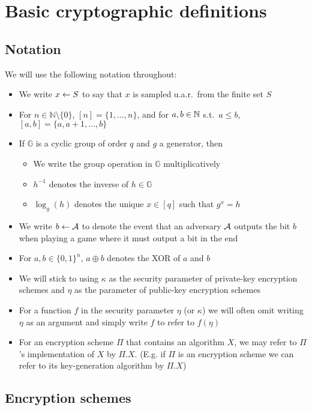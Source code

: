 \section{Basic cryptographic definitions} \label{sec:preliminaries-appendix}

\subsection{Notation}

We will use the following notation throughout:
\begin{itemize}
	\item We write $x \leftarrow S$ to say that $x$ is sampled u.a.r.\ from the finite set $S$
	\item For $n \in \mathbb{N} \setminus \{0\}$, $[n] = \{1, \ldots, n\}$, and for $a, b \in \mathbb{N}$ s.t.\ $a \le b$, $[a, b] = \{a, a + 1, \ldots, b\}$
	\item If $\mathbb{G}$ is a cyclic group of order $q$ and $g$ a generator, then
	      \begin{itemize}
		      \item We write the group operation in $\mathbb{G}$ multiplicatively
		      \item $h^{-1}$ denotes the inverse of $h \in \mathbb{G}$
		      \item $\log_g(h)$ denotes the unique $x \in [q]$ such that $g^x = h$
	      \end{itemize}
	\item We write $b \leftarrow \mathcal{A}$ to denote the event that an adversary $\mathcal{A}$ outputs the bit $b$ when playing a game where it must output a bit in the end
	\item For $a, b \in \{0, 1\}^n$, $a \oplus b$ denotes the XOR of $a$ and $b$
	\item We will stick to using $\kappa$ as the security parameter of private-key encryption schemes and $\eta$ as the parameter of public-key encryption schemes
	\item For a function $f$ in the security parameter $\eta$ (or $\kappa$) we will often omit writing $\eta$ as an argument and simply write $f$ to refer to $f(\eta)$
	\item For an encryption scheme $\Pi$ that contains an algorithm $X$, we may refer to $\Pi$'s implementation of $X$ by $\Pi.X$. (E.g. if $\Pi$ is an encryption scheme we can refer to its key-generation algorithm by $\Pi.X$)
\end{itemize}

\subsection{Encryption schemes}

